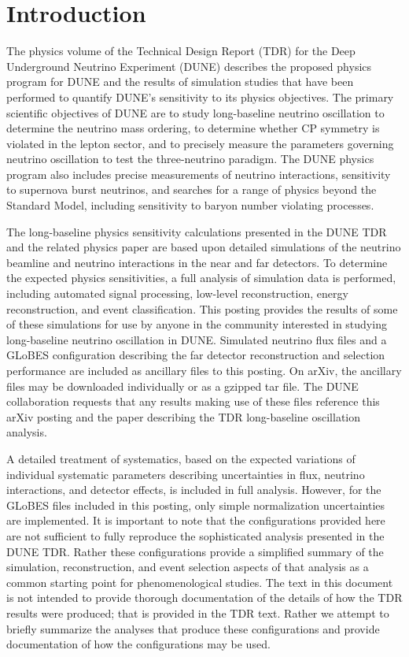 \documentclass[aps,prd,superscriptaddress]{revtex4-1}
\begin{document}
\section{Introduction}
The physics volume of the Technical Design Report (TDR)\cite{Abi:2020evt}  for the Deep Underground Neutrino
Experiment (DUNE) describes the proposed physics program for DUNE and the results of simulation
studies that have been performed to quantify DUNE's sensitivity to its physics objectives.
The primary scientific objectives of DUNE are
to study long-baseline neutrino oscillation to determine the neutrino mass ordering, to determine whether
CP symmetry is violated in the lepton sector, and to precisely measure the parameters governing neutrino
oscillation to test the three-neutrino paradigm. The DUNE physics program also includes precise measurements
of neutrino interactions, sensitivity to supernova burst neutrinos, and searches for a range of physics
beyond the Standard Model, including sensitivity to baryon number violating processes.


The long-baseline physics sensitivity calculations presented in the DUNE TDR
and the related physics paper \cite{Abi:2020qib}
are based upon detailed
simulations of the neutrino beamline and neutrino interactions in the near and far detectors.
To determine the expected physics sensitivities, a full analysis of simulation data is performed, including
automated signal processing, low-level reconstruction, energy reconstruction, and event classification.
This posting provides the results of some of these simulations for use by
anyone in the community interested in studying long-baseline neutrino oscillation in DUNE.
Simulated neutrino flux files and a GLoBES configuration describing
the far detector reconstruction and selection performance are included as ancillary files to
this posting. On arXiv, the ancillary files may be downloaded individually or as
a gzipped tar file.
The DUNE collaboration requests that any results making use of these files
reference this arXiv posting and the paper
describing the TDR long-baseline oscillation analysis\cite{Abi:2020qib}.

A detailed treatment of systematics, based on the expected variations of individual systematic parameters
describing uncertainties in flux, neutrino interactions, and detector effects, is included in full analysis.
However, for the GLoBES files included in this posting, only simple normalization uncertainties are implemented.
It is important to note that the configurations
provided here are not sufficient to fully reproduce the sophisticated analysis presented in the DUNE
TDR. Rather these configurations provide a simplified summary of the simulation, reconstruction, and
event selection aspects of that analysis as a common starting point for phenomenological studies.
The text in this document is not intended to provide thorough documentation of the details of how the
TDR results were produced; that is provided in the TDR text.
Rather we attempt to briefly summarize the analyses that produce these configurations and
provide documentation of how the configurations may be used.
\end{document}

